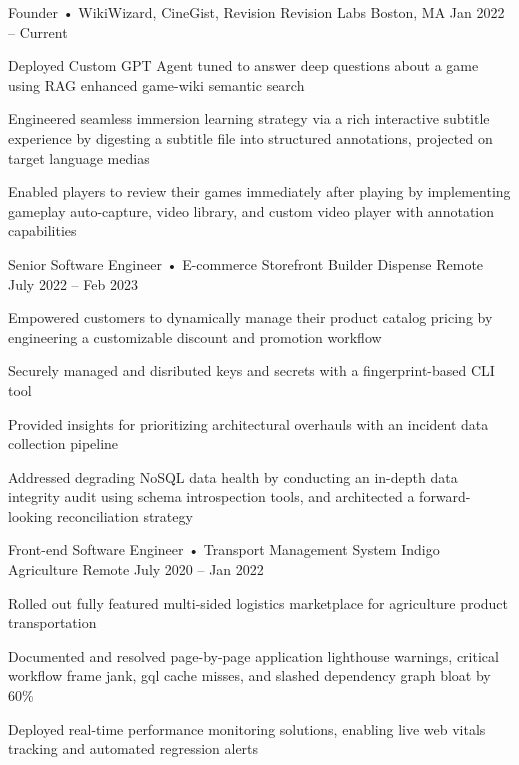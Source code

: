 \documentclass[]{awesome-cv}
\begin{document}
\begin{cventries}
	\cventry
	{Founder • WikiWizard, CineGist, Revision}
	{Revision Labs}
	{Boston, MA}
	{Jan 2022 – Current}
	{\begin{cvitems}
		\item {Deployed Custom GPT Agent tuned to answer deep questions about a game using RAG enhanced game-wiki semantic search}
		\item {Engineered seamless immersion learning strategy via a rich interactive subtitle experience by digesting a subtitle file into structured annotations, projected on target language medias}
		\item {Enabled players to review their games immediately after playing by implementing gameplay auto-capture, video library, and custom video player with annotation capabilities}
		\end{cvitems}}
	\cventry
	{Senior Software Engineer • E-commerce Storefront Builder}
	{Dispense}
	{Remote}
	{July 2022 – Feb 2023}
	{\begin{cvitems}
		\item {Empowered customers to dynamically manage their product catalog pricing by engineering a customizable discount and promotion workflow}
		\item {Securely managed and disributed keys and secrets with a fingerprint-based CLI tool}
		\item {Provided insights for prioritizing architectural overhauls with an incident data collection pipeline}
		\item {Addressed degrading NoSQL data health by conducting an in-depth data integrity audit using schema introspection tools, and architected a forward-looking reconciliation strategy}
		\end{cvitems}}
	\cventry
	{Front-end Software Engineer • Transport Management System}
	{Indigo Agriculture}
	{Remote}
	{July 2020 – Jan 2022}
	{\begin{cvitems}
		\item {Rolled out fully featured multi-sided logistics marketplace for agriculture product transportation}
		\item {Documented and resolved page-by-page application lighthouse warnings, critical workflow frame jank, gql cache misses, and slashed dependency graph bloat by 60\%}
		\item {Deployed real-time performance monitoring solutions, enabling live web vitals tracking and automated regression alerts}
		\end{cvitems}}
	\cventry

\end{cventries}
\end{document}
